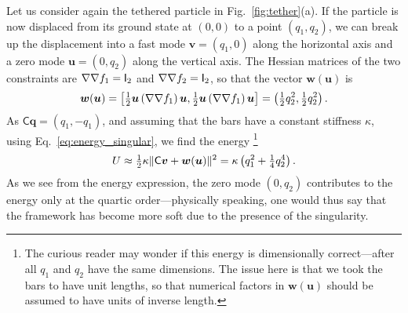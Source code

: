 \begin{example*}
  Let us consider again the tethered particle in Fig.~\ref{fig:tether}(a).
  If the particle is now displaced from its ground state at $(0, 0)$ to a point $(q_{1},q_{2})$, we can break up the displacement into a fast mode $\bm{v} = (q_{1}, 0)$ along the horizontal axis and a zero mode $\bm{u} = (0, q_{2})$ along the vertical axis.
  The Hessian matrices of the two constraints are $\nabla\nabla f_{1} = \mathsf{I}_{2}$ and $\nabla\nabla f_{2} = \mathsf{I}_{2}$, so that the vector $\bm{w}(\bm{u})$ is
  \begin{equation}
      \bm{w}(\bm{u}) = \left[\tfrac{1}{2}\bm{u}\left(\nabla\nabla f_{1}\right)\bm{u}, \tfrac{1}{2}\bm{u}\left(\nabla\nabla f_{1}\right)\bm{u}\right]
                     = \left(\tfrac{1}{2}q_{2}^{2}, \tfrac{1}{2}q_{2}^{2}\right).
  \end{equation}
  As $\mathsf{C}\bm{q} = (q_{1}, -q_{1})$, and assuming that the bars have a constant stiffness $\kappa$, using Eq.~\eqref{eq:energy_singular}, we find the energy%
  \footnote{The curious reader may wonder if this energy is dimensionally correct---after all $q_{1}$ and $q_{2}$ have the same dimensions.
  The issue here is that we took the bars to have unit lengths, so that numerical factors in $\bm{w}(\bm{u})$ should be assumed to have units of inverse length.}
  \begin{equation}
    U \approx \tfrac{1}{2}\kappa\lVert\mathsf{C}\bm{v} + \bm{w}(\bm{u})\rVert^{2} = \kappa\left(q_{1}^{2} + \tfrac{1}{4}q_{2}^{4}\right).
  \end{equation}
  As we see from the energy expression, the zero mode $(0, q_{2})$ contributes to the energy only at the quartic order---physically speaking, one would thus say that the framework has become more soft due to the presence of the singularity.
\end{example*}

